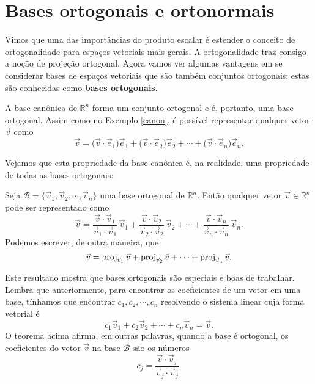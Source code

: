 \documentclass[../livro.tex]{subfiles}  %
\begin{document}
\construirExer

\section{Bases ortogonais e ortonormais}


Vimos que uma das importâncias do produto escalar é estender o conceito de ortogonalidade para espaços vetoriais mais gerais. A ortogonalidade traz consigo a noção de projeção ortogonal. Agora vamos ver algumas vantagens em se considerar bases de espaços vetoriais que são também conjuntos ortogonais; estas são conhecidas como \textbf{bases ortogonais}.

\begin{example}\label{ortonormal}
	A base canônica de $\mathbb{R}^n$ forma um conjunto ortogonal e é, portanto, uma base ortogonal. Assim como no Exemplo \ref{canon}, é possível representar qualquer vetor $\vec{v}$ como
	\begin{equation}
	\vec{v} = \big( \vec{v} \cdot \vec{e}_1 \big) \vec{e}_1 + \big( \vec{v} \cdot \vec{e}_2 \big) \vec{e}_2  + \cdots  + \big( \vec{v} \cdot \vec{e}_n \big) \vec{e}_n.
	\end{equation}
\end{example}

Vejamos que esta propriedade da base canônica é, na realidade, uma propriedade de todas as bases ortogonais:

\begin{theorem}\label{thm:base-ortogonal}
	Seja $\mathcal{B} = \{ \vec{v}_1, \vec{v}_2, \cdots, \vec{v}_n\}$ uma base ortogonal de $\mathbb{R}^n$. Então qualquer vetor $\vec{v} \in \mathbb{R}^n$ pode ser representado como
	\begin{equation}
	\vec{v} = \frac{\vec{v} \cdot \vec{v}_1}{\vec{v}_1 \cdot \vec{v}_1} \, \vec{v}_1 + \frac{\vec{v} \cdot \vec{v}_2}{\vec{v}_2 \cdot \vec{v}_2} \, \vec{v}_2  + \cdots  + \frac{\vec{v} \cdot \vec{v}_n}{\vec{v}_n \cdot \vec{v}_n} \, \vec{v}_n.
	\end{equation} Podemos escrever, de outra maneira, que
	\begin{equation}
	\vec{v} = \operatorname{proj}_{\vec{v}_1} \vec{v} +  \operatorname{proj}_{\vec{v}_2} \vec{v}  + \cdots  + \operatorname{proj}_{\vec{v}_n} \vec{v}.
	\end{equation}
\end{theorem}

Este resultado mostra que bases ortogonais são especiais e boas de trabalhar. Lembra que anteriormente, para encontrar os coeficientes de um vetor em uma base, tínhamos que encontrar $c_1, c_2, \cdots, c_n$ resolvendo o sistema linear cuja forma vetorial é
\begin{equation}
c_1 \vec{v}_1 + c_2 \vec{v}_2 + \cdots + c_n \vec{v}_n = \vec{v}.
\end{equation} O teorema acima afirma, em outras palavras, quando a base é ortogonal, os coeficientes do vetor $\vec{v}$ na base $\mathcal{B}$ são os números
\begin{equation}
c_j = \frac{\vec{v} \cdot \vec{v}_j}{\vec{v}_j \cdot \vec{v}_j}.
\end{equation}
\end{document}
